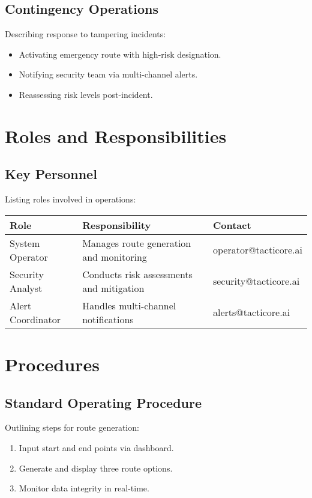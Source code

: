 \documentclass[a4paper,12pt]{report}
\begin{document}
\section{Contingency Operations}
Describing response to tampering incidents:
\begin{itemize}[leftmargin=*]
    \item Activating emergency route with high-risk designation.
    \item Notifying security team via multi-channel alerts.
    \item Reassessing risk levels post-incident.
\end{itemize}

\chapter{Roles and Responsibilities}
\section{Key Personnel}
Listing roles involved in operations:
\begin{longtable}{|p{4cm}|p{6cm}|p{4cm}|}
\hline
\textbf{Role} & \textbf{Responsibility} & \textbf{Contact} \\ \hline
System Operator & Manages route generation and monitoring & operator@tacticore.ai \\ \hline
Security Analyst & Conducts risk assessments and mitigation & security@tacticore.ai \\ \hline
Alert Coordinator & Handles multi-channel notifications & alerts@tacticore.ai \\ \hline
\end{longtable}

\chapter{Procedures}
\section{Standard Operating Procedure}
Outlining steps for route generation:
\begin{enumerate}[leftmargin=*]
    \item Input start and end points via dashboard.
    \item Generate and display three route options.
    \item Monitor data integrity in real-time.
\end{enumerate}
\end{document}
